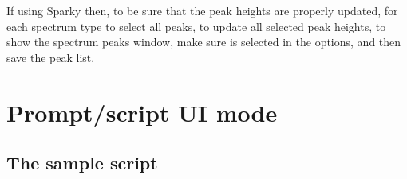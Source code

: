 If using Sparky then, to be sure that the peak heights are properly updated, for each spectrum type  to select all peaks,  to update all selected peak heights,  to show the spectrum peaks window, make sure  is selected in the options, and then save the peak list.



\section{Prompt/script UI mode}



\subsection{The sample script}

